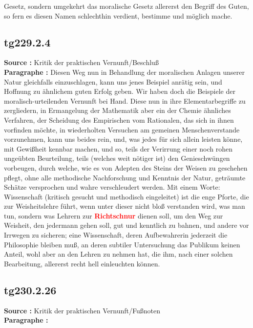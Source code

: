 \documentclass[a4paper,12pt,twoside]{book}
\newcommand{\match}[1]{\textcolor{red}{\textbf{#1}}}
\begin{document}
Gesetz, sondern umgekehrt das moralische Gesetz allererst den Begriff des Guten, so fern es diesen Namen schlechthin verdient, bestimme und möglich mache. 
	
	\subsection*{tg229.2.4} 
	\textbf{Source : }Kritik der praktischen Vernunft/Beschluß\\  
	
	\noindent\textbf{Paragraphe : }Diesen Weg nun in Behandlung der moralischen Anlagen unserer Natur gleichfalls einzuschlagen, kann uns jenes Beispiel anrätig sein, und Hoffnung zu ähnlichem guten Erfolg geben. Wir haben doch die Beispiele der moralisch-urteilenden Vernunft bei Hand. Diese nun in ihre Elementarbegriffe zu zergliedern, in Ermangelung der Mathematik aber ein der Chemie ähnliches Verfahren, der Scheidung des Empirischen vom Rationalen, das sich in ihnen vorfinden  möchte, in wiederholten Versuchen am gemeinen Menschenverstande vorzunehmen, kann uns beides rein, und, was jedes für sich allein leisten könne, mit Gewißheit kennbar machen, und so, teils der Verirrung einer noch rohen ungeübten Beurteilung, teils (welches weit nötiger ist) den Genieschwüngen vorbeugen, durch welche, wie es von Adepten des Steins der Weisen zu geschehen pflegt, ohne alle methodische Nachforschung und Kenntnis der Natur, geträumte Schätze versprochen und wahre verschleudert werden. Mit einem Worte: Wissenschaft (kritisch gesucht und methodisch eingeleitet) ist die enge Pforte, die zur Weisheitslehre führt, wenn unter dieser nicht bloß verstanden wird, was man tun, sondern was Lehrern zur \match{Richtschnur} dienen soll, um den Weg zur Weisheit, den jedermann gehen soll, gut und kenntlich zu bahnen, und andere vor Irrwegen zu sicheren; eine Wissenschaft, deren Aufbewahrerin jederzeit die Philosophie bleiben muß, an deren subtiler Untersuchung das Publikum keinen Anteil, wohl aber an den Lehren zu nehmen hat, die ihm, nach einer solchen Bearbeitung, allererst recht hell einleuchten können. 
	
	\subsection*{tg230.2.26} 
	\textbf{Source : }Kritik der praktischen Vernunft/Fußnoten\\  
	
	\noindent\textbf{Paragraphe : }
	
\end{document}
